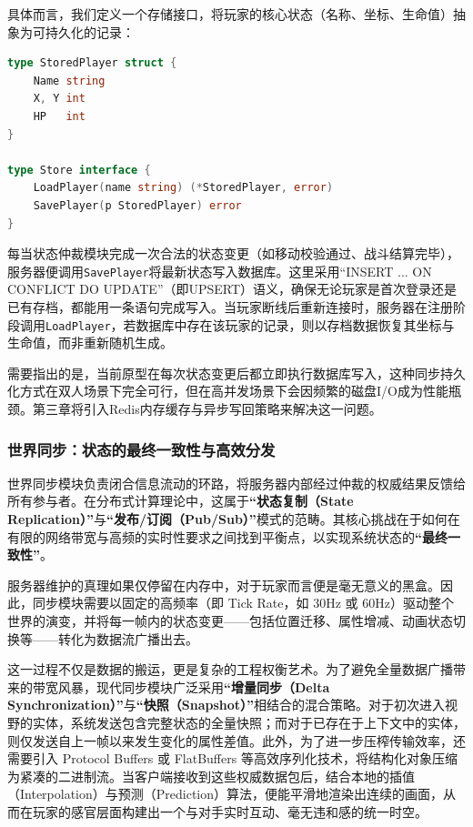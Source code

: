 具体而言，我们定义一个存储接口，将玩家的核心状态（名称、坐标、生命值）抽象为可持久化的记录：

\begin{tcolorbox}[title=持久化存储接口]
\begin{lstlisting}[style=codeblock, language=go]
type StoredPlayer struct {
    Name string
    X, Y int
    HP   int
}

type Store interface {
    LoadPlayer(name string) (*StoredPlayer, error)
    SavePlayer(p StoredPlayer) error
}
\end{lstlisting}
\end{tcolorbox}

每当状态仲裁模块完成一次合法的状态变更（如移动校验通过、战斗结算完毕），服务器便调用\texttt{SavePlayer}将最新状态写入数据库。这里采用``INSERT ... ON CONFLICT DO UPDATE''（即UPSERT）语义，确保无论玩家是首次登录还是已有存档，都能用一条语句完成写入。当玩家断线后重新连接时，服务器在注册阶段调用\texttt{LoadPlayer}，若数据库中存在该玩家的记录，则以存档数据恢复其坐标与生命值，而非重新随机生成。

需要指出的是，当前原型在每次状态变更后都立即执行数据库写入，这种同步持久化方式在双人场景下完全可行，但在高并发场景下会因频繁的磁盘I/O成为性能瓶颈。第三章将引入Redis内存缓存与异步写回策略来解决这一问题。
\subsubsection{世界同步：状态的最终一致性与高效分发}

世界同步模块负责闭合信息流动的环路，将服务器内部经过仲裁的权威结果反馈给所有参与者。在分布式计算理论中，这属于\textbf{“状态复制（State Replication）”}与\textbf{“发布/订阅（Pub/Sub）”}模式的范畴。其核心挑战在于如何在有限的网络带宽与高频的实时性要求之间找到平衡点，以实现系统状态的\textbf{“最终一致性”}。

服务器维护的真理如果仅停留在内存中，对于玩家而言便是毫无意义的黑盒。因此，同步模块需要以固定的高频率（即 Tick Rate，如 30Hz 或 60Hz）驱动整个世界的演变，并将每一帧内的状态变更——包括位置迁移、属性增减、动画状态切换等——转化为数据流广播出去。

这一过程不仅是数据的搬运，更是复杂的工程权衡艺术。为了避免全量数据广播带来的带宽风暴，现代同步模块广泛采用\textbf{“增量同步（Delta Synchronization）”}与\textbf{“快照（Snapshot）”}相结合的混合策略。对于初次进入视野的实体，系统发送包含完整状态的全量快照；而对于已存在于上下文中的实体，则仅发送自上一帧以来发生变化的属性差值。此外，为了进一步压榨传输效率，还需要引入 Protocol Buffers 或 FlatBuffers 等高效序列化技术，将结构化对象压缩为紧凑的二进制流。当客户端接收到这些权威数据包后，结合本地的插值（Interpolation）与预测（Prediction）算法，便能平滑地渲染出连续的画面，从而在玩家的感官层面构建出一个与对手实时互动、毫无违和感的统一时空。

